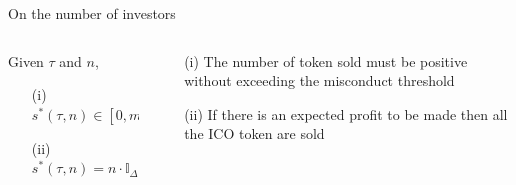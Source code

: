\documentclass{beamer}
\begin{document}
\begin{frame}{On the number of investors}
\scriptsize
\begin{columns}
\begin{column}{0.5\textwidth}
\begin{tcolorbox}[enhanced,drop shadow, title=Proposition]
Given $\tau$ and $n$, 
\begin{itemize}
  \item[(i)] $s^\ast(\tau,n)\in[0,m\left(1-\frac{c}{v}\right)]$
  \item[(ii)] $s^\ast(\tau,n) = n\cdot\mathbb{I}_{\Delta\geq 0}$
\end{itemize}
\end{tcolorbox}
\end{column}
\begin{column}{0.5\textwidth}
\begin{tcolorbox}[enhanced,drop shadow, title=Interpretation ]
\begin{itemize}
  \item[(i)] The number of token sold must be positive without exceeding the misconduct threshold
  \item[(ii)] If there is an expected profit to be made then all the ICO token are sold
\end{itemize}
\end{tcolorbox}
\end{column}
\end{columns}
\end{frame}
\end{document}
